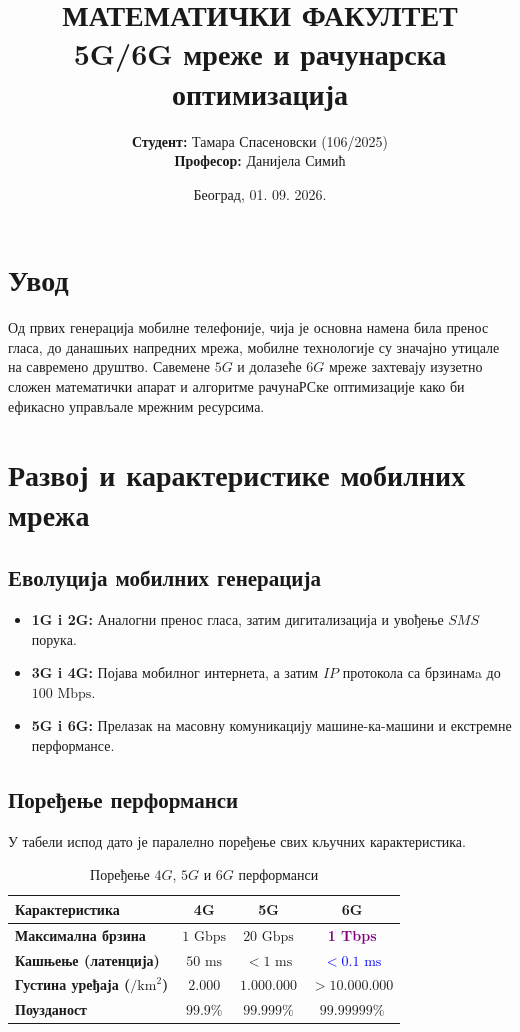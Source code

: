 \documentclass[11pt,a4paper]{article}
\title{\textbf{\Large МАТЕМАТИЧКИ ФАКУЛТЕТ}\\ \vspace{0.5cm} \Huge 5G/6G мреже и рачунарска оптимизација}
\author{\textbf{Студент:} Тамара Спасеновски (106/2025) \\ \textbf{Професор:} Данијела Симић}
\date{Београд, 01. 09. 2026.}
\begin{document}
\maketitle
\thispagestyle{empty}
\clearpage

\tableofcontents
\clearpage
{}

\section{Увод}
Од првих генерација мобилне телефоније, чија је основна намена била пренос гласа, до данашњих напредних мрежа, мобилне технологије су значајно утицале на савремено друштво. Савемене $5G$ и долазеће $6G$ мреже захтевају изузетно сложен математички апарат и алгоритме рачунаРСке оптимизације како би ефикасно управљале мрежним ресурсима.

\section{Развој и карактеристике мобилних мрежа}

\subsection{Еволуција мобилних генерација}
\begin{itemize}
    \item \textbf{1G i 2G:} Аналогни пренос гласа, затим дигитализација и увођење $SMS$ порука.
    \item \textbf{3G i 4G:} Појава мобилног интернета, а затим $IP$ протокола са брзинамa до $100\text{ Mbps}$.
    \item \textbf{5G i 6G:} Прелазак на масовну комуникацију машине-ка-машини и екстремне перформансе.
\end{itemize}

\subsection{Поређење перформанси}
У табели испод дато је паралелно поређење свих кључних карактеристика.

\begin{table}[h!]
\centering
\caption{Поређење $4G$, $5G$ и $6G$ перформанси}
\vspace{0.2cm}
\begin{tabular}{|l|c|c|c|}
\hline
\textbf{Карактеристика} & \textbf{4G} & \textbf{5G} & \textbf{6G} \\ \hline
\textbf{Максимална брзина} & $1\text{ Gbps}$ & $20\text{ Gbps}$ & \textcolor{purple}{\textbf{1 Tbps}} \\ \hline
\textbf{Кашњење (латенција)} & $50\text{ ms}$ & $< 1\text{ ms}$ & \textcolor{blue}{\textbf{$< 0.1\text{ ms}$}} \\ \hline
\textbf{Густина уређаја ($/\text{km}^2$)} & $2.000$ & $1.000.000$ & $> 10.000.000$ \\ \hline
\textbf{Поузданост} & $99.9\%$ & $99.999\%$ & $99.99999\%$ \\ \hline
\end{tabular}
\end{table}
\end{document}
